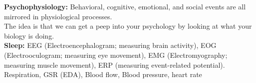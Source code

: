 \textbf{Psychophysiology:} Behavioral, cognitive, emotional, and social events are all mirrored in physiological processes. \\

The idea is that we can get a peep into your psychology by looking at what your biology is doing. \\

\textbf{Sleep:} EEG (Electroencephalogram; measuring brain activity), EOG (Electrooculogram; measuring eye movement), EMG (Electromyography; measuring muscle movement), ERP (measuring event-related potential). \\

Respiration, GSR (EDA), Blood flow, Blood pressure, heart rate 